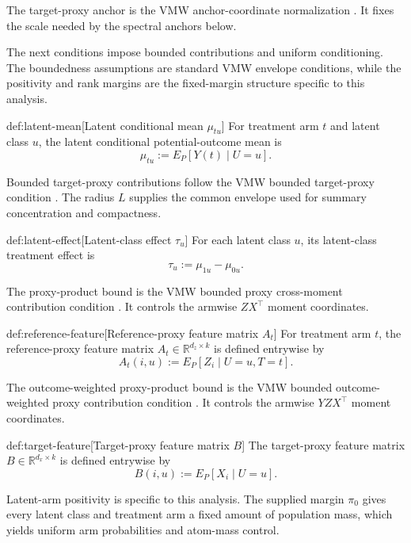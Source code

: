 \documentclass[11pt]{article}
\begin{document}
The target-proxy anchor is the VMW anchor-coordinate normalization \citep{VirkMazaheriWu2026}. It fixes the scale needed by the spectral anchors below.

The next conditions impose bounded contributions and uniform conditioning. The boundedness assumptions are standard VMW envelope conditions, while the positivity and rank margins are the fixed-margin structure specific to this analysis.

\begin{definitionv}{def:latent-mean}[Latent conditional mean \(\mu_{tu}\)]
For treatment arm \(t\) and latent class \(u\), the latent conditional potential-outcome mean is
\[
\mu_{tu}:=E_P\!\left[Y(t)\mid U=u\right].
\]
\end{definitionv}

Bounded target-proxy contributions follow the VMW bounded target-proxy condition \citep{VirkMazaheriWu2026}. The radius \(L\) supplies the common envelope used for summary concentration and compactness.

\begin{definitionv}{def:latent-effect}[Latent-class effect \(\tau_u\)]
For each latent class \(u\), its latent-class treatment effect is
\[
\tau_u:=\mu_{1u}-\mu_{0u}.
\]
\end{definitionv}

The proxy-product bound is the VMW bounded proxy cross-moment contribution condition \citep{VirkMazaheriWu2026}. It controls the armwise \(ZX^\top\) moment coordinates.

\begin{definitionv}{def:reference-feature}[Reference-proxy feature matrix \(A_t\)]
For treatment arm \(t\), the reference-proxy feature matrix \(A_t\in\mathbb R^{d_z\times k}\) is defined entrywise by
\[
A_t(i,u):=E_P\!\left[Z_i\mid U=u,T=t\right].
\]
\end{definitionv}

The outcome-weighted proxy-product bound is the VMW bounded outcome-weighted proxy contribution condition \citep{VirkMazaheriWu2026}. It controls the armwise \(YZX^\top\) moment coordinates.

\begin{definitionv}{def:target-feature}[Target-proxy feature matrix \(B\)]
The target-proxy feature matrix \(B\in\mathbb R^{d_x\times k}\) is defined entrywise by
\[
B(i,u):=E_P\!\left[X_i\mid U=u\right].
\]
\end{definitionv}

Latent-arm positivity is specific to this analysis. The supplied margin \(\pi_0\) gives every latent class and treatment arm a fixed amount of population mass, which yields uniform arm probabilities and atom-mass control.
\end{document}
